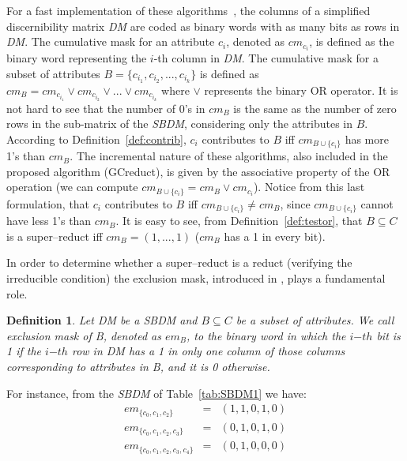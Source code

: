 \documentclass[letterpaper, twoside, openright, 12pt]{book}%
\newtheorem{definition}{Definition}
\begin{document}
	
	For a fast implementation of these algorithms~\citep{Sanchez10,Lias13}, the columns of a simplified discernibility matrix \textit{DM} are coded as binary words with as many bits as rows in \textit{DM}. The cumulative mask for an attribute $c_i$, denoted as $cm_{c_i}$, is defined as the binary word representing the $i$-th column in \textit{DM}. The cumulative mask for a subset of attributes $B=\lbrace c_{i_1},c_{i_2},...,c_{i_k} \rbrace$ is defined	as $cm_B = cm_{c_{i_1}} \vee cm_{c_{i_2}} \vee ... \vee cm_{c_{i_k}}$ where $\vee$ represents the binary OR operator. It is not hard to see that the number of 0's in $cm_B$ is the same as the number of zero rows in the sub-matrix of the \textit{SBDM}, considering only the attributes in $B$. According to Definition~\ref{def:contrib}, $c_i$ contributes to $B$ iff $cm_{B\cup \lbrace c_i\rbrace}$ has more 1's than $cm_B$. The incremental nature of these algorithms, also included in  the proposed algorithm (GCreduct), is given by the associative property of the OR operation (we can compute $cm_{B\cup \lbrace c_i\rbrace}=cm_B\vee cm_{c_i}$). Notice from this last formulation, that $c_i$ contributes to $B$ iff $cm_{B\cup \lbrace c_i\rbrace}\neq cm_B$, since $cm_{B\cup \lbrace c_i\rbrace}$ cannot have less 1's than $cm_B$. It is easy to see, from Definition~\ref{def:testor}, that $B \subseteq C$ is a super--reduct iff $cm_B=(1,...,1)$ ($cm_B$ has a 1 in every bit).
	
	In order to determine whether a super--reduct is a reduct (verifying the irreducible condition) the
	exclusion mask, introduced in \cite{Lias09}, plays a fundamental role. 
	
	\begin{definition}\label{def:exclusion}
		Let DM be a SBDM and $B \subseteq C$ be a subset of attributes. We call exclusion mask of B, denoted as $em_B$, to the binary word in which the $i{\mathit{-th}}$ bit is 1 if the $i{\mathit{-th}}$ row in DM has a 1 in only one column of those columns corresponding to attributes in B, and it is 0 otherwise.
	\end{definition}
	
	For instance, from the \textit{SBDM} of Table~\ref{tab:SBDM1} we have:
	$$\begin{array}{lcc}
		em_{\lbrace c_0,c_1,c_2\rbrace}         &=& (1,1,0,1,0)\\
		em_{\lbrace c_0,c_1,c_2,c_3\rbrace}     &=& (0,1,0,1,0)\\
		em_{\lbrace c_0,c_1,c_2,c_3,c_4\rbrace} &=& (0,1,0,0,0)
	\end{array}$$
	
\end{document}
